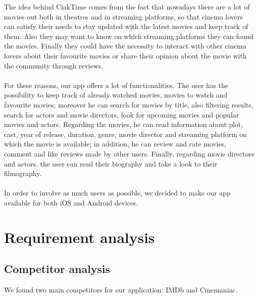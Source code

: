 \documentclass[12pt, a4paper]{article}
\begin{document}
The idea behind CiakTime comes from the fact that nowadays there are a lot of movies out 
both in theatres and in streaming platforms, so that cinema lovers can satisfy their
needs to stay updated with the latest movies and keep track of them. 
Also they may want to know on which streaming platforms they can found the movies.
Finally they could have the necessity to interact with other cinema lovers about their 
favourite movies or share their opinion about the movie with the community through reviews.
\\\\
For these reasons, our app offers a lot of functionalities. 
The user has the possibility to keep track of already watched movies, movies to watch and favourite movies;
moreover he can search for movies by title, also filtering results, search for actors and movie directors, 
look for upcoming movies and popular movies and actors.
Regarding the movies, he can read information about plot, cast, year of release, duration, genre,
movie director and streaming platform on which the movie is available; in addition, he can 
review and rate movies, comment and like reviews made by other users.
Finally, regarding movie directors and actors, the user can read their biography and take a look to their
filmography.
\\\\
In order to involve as much users as possible, we decided to make our app available for both iOS and Android devices.






\newpage

\section{Requirement analysis}

\subsection{Competitor analysis}
We found two main competitors for our application: IMDb and Cinemaniac.
\end{document}

